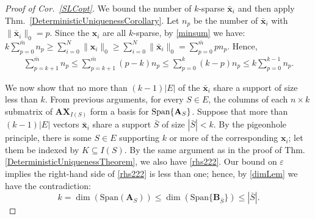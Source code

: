 \documentclass[9pt,twocolumn]{pnas-new}
\begin{document}
 
\begin{proof}[Proof of Cor.~\ref{SLCopt}]
We bound the number of $k$-sparse $\mathbf{\bar x}_i$ and then apply Thm.~\ref{DeterministicUniquenessCorollary}. 
Let $n_p$ be the number of $\mathbf{\bar x}_i$ with $\|\mathbf{\bar x}_i\|_0 = p$.  %
Since the $\mathbf{x}_i$ are all $k$-sparse, by \eqref{minsum} we have:
\mbox{$k \sum_{p = 0}^{\bar m} n_p \geq \sum_{i=0}^N \|\mathbf{x}_i\|_0 \geq \sum_{i=0}^N \|\mathbf{\bar x}_i\|_0 = \sum_{p=0}^{\bar m} p n_p.$}
Hence,
\begin{align}\label{eqn}
\sum_{p = k+1}^{\bar m} n_p \leq \sum_{p = k+1}^{\bar m} (p-k) n_p \leq \sum_{p = 0}^k (k-p)n_p \leq k \sum_{p = 0}^{k-1} n_p.
\end{align}

We now show that no more than $(k-1)|E|$ of the $\mathbf{\bar x}_i$ share a support of size less than $k$. 
From previous arguments, for every $S \in E$, the columns of each $n \times k$ submatrix of $\mathbf{AX}_{I(S)}$ form a basis for $\text{\rm Span}\{\mathbf{A}_S\}$.
Suppose that more than $(k-1)|E|$ vectors $\mathbf{\bar x}_i$ share a support $\bar S$ of size $|\bar{S}| < k$. By the pigeonhole principle, there is some $S \in E$ supporting $k$ or more of the corresponding $\mathbf{x}_i$; let them be indexed by $K \subseteq I(S)$.  By the same argument as in the proof of Thm.\ref{DeterministicUniquenessTheorem}, we also have \eqref{rhs222}. Our bound on $\varepsilon$ implies the right-hand side of \eqref{rhs222} is less than one; hence, by \eqref{dimLem} we have the contradiction: 
\[k = \dim(\text{Span}(\mathbf{A}_S)) \leq \dim(\text{Span}\{\mathbf{B}_{\bar S}\}) \leq |\bar S|.\]


\end{proof}
\end{document}
